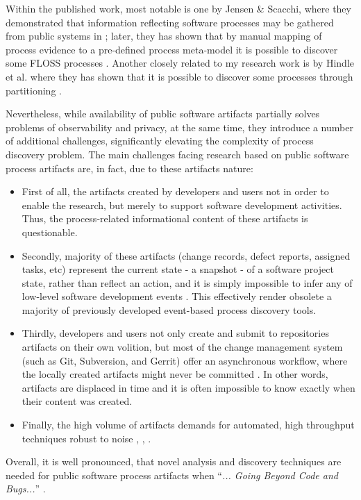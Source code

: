 Within the published work, most notable is one by Jensen \& Scacchi, where they demonstrated that
 information reflecting software processes may be gathered from public systems in \cite{citeulike:12550640};
later, they has shown that by manual mapping of process evidence to a pre-defined process meta-model 
it is possible to discover some FLOSS processes \cite{citeulike:5043664} \cite{citeulike:5128808}. Another
closely related to my research work is by Hindle et al. where they has shown that it is possible to 
discover some processes through partitioning \cite{citeulike:10377366}.

Nevertheless, while availability of public software artifacts partially solves problems of observability and privacy, 
at the same time, they introduce a number of additional challenges, significantly elevating the complexity 
of process discovery problem. The main challenges facing research based on public software process 
artifacts are, in fact, due to these artifacts nature:
\begin{itemize}
\item First of all, the artifacts created by developers and users not in order to enable the research,
but merely to support software development activities. Thus, the process-related informational content of these
artifacts is questionable.
\item Secondly, majority of these artifacts (change records, defect reports, assigned tasks, etc) represent the current 
state - a snapshot - of a software project state, rather than reflect an action, and it is simply impossible to
infer any of low-level software development events \cite{citeulike:1296888}.
This effectively render obsolete a majority of previously developed event-based process discovery tools.
\item Thirdly, developers and users not only create and submit to repositories artifacts on their own volition,
but most of the change management system (such as Git, Subversion, and Gerrit) offer an asynchronous workflow, 
where the locally created artifacts might never be committed \cite{citeulike:2280690} \cite{citeulike:9037939}. In other
words, artifacts are displaced in time and it is often impossible to know exactly when their content was created.
 \item Finally, the high volume of artifacts demands for automated, high throughput techniques robust to noise
 \cite{citeulike:12550438}, \cite{citeulike:7853299}, \cite{citeulike:4534888}.
\end{itemize}
Overall, it is well pronounced, that novel analysis and discovery techniques are needed for public software process
artifacts when ``\textit{... Going Beyond Code and Bugs...}'' \cite{citeulike:7853299}.

